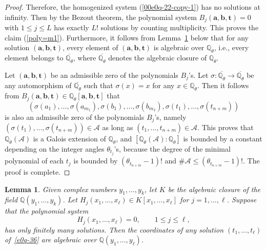 \documentclass[pdftex]{sigma}
\numberwithin{equation}{section}
\newtheorem{Lemma}[Theorem]{Lemma}
\def\Q{\mathbb Q}
\begin{document}
\begin{proof}
Therefore, the homogenized system (\ref{00e0q-22-copy-1}) has no
solutions at infinity. Then by the Bezout theorem, the polynomial
system $B_j(\boldsymbol a,\boldsymbol b,\boldsymbol t)=0$ with $1\leq
j\leq L$ has exactly $L!$
solutions by counting multiplicity. This proves the claim (\ref{poly=m1}). Furthermore, it follows from Lemma~\ref{00lemma-2-10} below that for any solution $(\boldsymbol a, \boldsymbol b, \boldsymbol t)$, every element of $(\boldsymbol a, \boldsymbol b, \boldsymbol t)$ is algebraic over $\Q_{\theta}$, i.e., every element belongs to $\overline{\Q_{\theta}}$, where
$\overline{\Q_{\theta}}$ denotes the algebraic closure of $\Q_{\theta}$.

Let $(\boldsymbol a, \boldsymbol b, \boldsymbol t)$ be an admissible
zero of the polynomials $B_j$'s.
Let $\sigma\colon \overline{\Q_{\theta}}\to \overline{\Q_{\theta}}$ be any automorphism of $\overline{\Q_{\theta}}$ such that $\sigma(x)=x$ for any $x\in \Q_{\theta}$. Then it follows from $B_j(\boldsymbol a,\boldsymbol b,\boldsymbol t)\in\mathbb{Q}_{\theta}[\boldsymbol a,\boldsymbol b,\boldsymbol t] $ that
\[
 (\sigma(a_1),\dots,\sigma(a_{m_1}),\sigma(b_1),\dots,
 \sigma(b_{m_2}),\sigma(t_1),\dots,\sigma(t_{n+m}))
\]
is also an admissible zero of the polynomials $B_j$'s, namely $(
\sigma(t_1),\dots,\sigma(t_{n+m}))\in \mathcal{A}$ as long as $(t_1,\dots, t_{n+m})\in \mathcal{A}$.
This proves that $\Q_{\theta}(\mathcal{A})$ is a Galois extension of $\Q_{\theta}$, and $[\Q_{\theta}(\mathcal{A}):\Q_{\theta}]$ is bounded by a constant depending on the integer angles $\theta_{t_{j}}$'s, because the degree of the minimal polynomial of each $t_j$ is bounded by $(\theta_{t_{n+m}}-1)!$ and $\# \mathcal{A}\leq (\theta_{t_{n+m}}-1)!$. The proof is complete.
\end{proof}

\begin{Lemma}\label{00lemma-2-10} Given complex numbers
 $y_1,\dots,y_k$, let $K$
 be the algebraic closure of the field $\Q(y_1,\dots,y_k)$.
Let $H_j(x_1,\dots,x_\ell)\in K[x_1,\dots,x_\ell]$ for
$j=1,\dots,\ell$. Suppose that the polynomial system
\begin{equation}\label{e0q-36}
 H_j(x_1,\dots,x_\ell)=0,\qquad 1\leq j\leq \ell,
\end{equation}
has only finitely many solutions. Then the coordinates of any solution
$(t_1,\dots,t_\ell)$ of~\eqref{e0q-36} are algebraic over
$\Q(y_1,\dots,y_\ell)$.
\end{Lemma}
\end{document}
